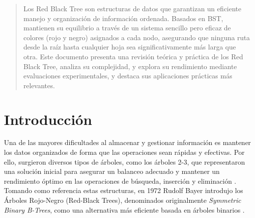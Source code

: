 \documentclass[conference]{IEEEtran}
\begin{document}




\maketitle

\begin{abstract}

Los Red Black Tree son estructuras de datos que garantizan un eficiente manejo y organización de información ordenada. Basados en BST, mantienen su equilibrio a través de un sistema sencillo pero eficaz de colores (rojo y negro) asignados a cada nodo, asegurando que ninguna ruta desde la raíz hasta cualquier hoja sea significativamente más larga que otra. Este documento presenta una revisión teórica y práctica de los Red Black Tree, analiza su complejidad, y explora su rendimiento mediante evaluaciones experimentales, y destaca sus aplicaciones prácticas más relevantes.


\end{abstract}





%
\IEEEpeerreviewmaketitle



\section{Introducción}

Una de las mayores dificultades al almacenar y gestionar información es mantener los datos organizados de forma que las operaciones sean rápidas y efectivas. Por ello, surgieron diversos tipos de árboles, como los árboles 2-3, que representaron una solución inicial para asegurar un balanceo adecuado y mantener un rendimiento óptimo en las operaciones de búsqueda, inserción y eliminación \cite{baeldungRedBlack}. Tomando como referencia estas estructuras, en 1972 Rudolf Bayer introdujo los Árboles Rojo-Negro (Red-Black Trees), denominados originalmente \textit{Symmetric Binary B-Trees}, como una alternativa más eficiente basada en árboles binarios \cite{ahuja2021}.\\
\end{document}
